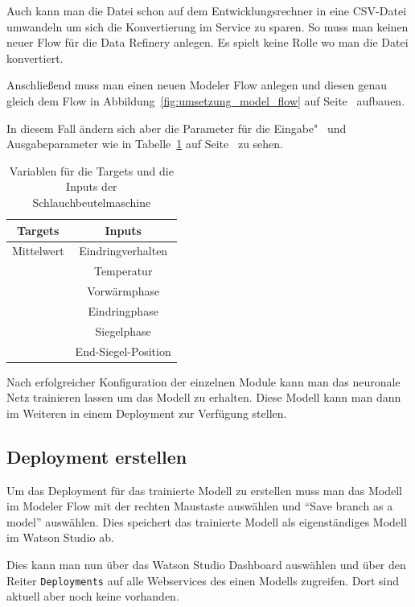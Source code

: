 Auch kann man die Datei schon auf dem Entwicklungsrechner in eine CSV-Datei umwandeln um sich die Konvertierung im
Service zu sparen. So muss man keinen neuer Flow für die Data Refinery anlegen. Es spielt keine Rolle wo man die Datei
konvertiert.

Anschließend muss man einen neuen Modeler Flow anlegen und diesen genau gleich dem Flow in
Abbildung~\ref{fig:umsetzung_model_flow} auf Seite~\pageref{fig:umsetzung_model_flow} aufbauen.

In diesem Fall ändern sich aber die Parameter für die Eingabe"~ und Ausgabeparameter wie in
Tabelle~\ref{tab:targets_inputs_siegeln} auf Seite~\pageref{tab:targets_inputs_siegeln} zu sehen.

\begin{table}[h]
    \centering
    \begin{tabular}{|c|c|}
        \hline
        \textbf{Targets} & \textbf{Inputs}\\
        \hline
        \hline
        Mittelwert & Eindringverhalten\\
        \hline
        & Temperatur\\
        \hline
        & Vorwärmphase\\
        \hline
        & Eindringphase\\
        \hline
        & Siegelphase\\
        \hline
        & End-Siegel-Position\\
        \hline
    \end{tabular}
    \caption{Variablen für die Targets und die Inputs der Schlauchbeutelmaschine}
    \label{tab:targets_inputs_siegeln}
\end{table}

Nach erfolgreicher Konfiguration der einzelnen Module kann man das neuronale Netz trainieren lassen um das Modell zu
erhalten. Diese Modell kann man dann im Weiteren in einem Deployment zur Verfügung stellen.

\subsection{Deployment erstellen}
Um das Deployment für das trainierte Modell zu erstellen muss man das Modell im Modeler Flow mit der rechten Maustaste
auswählen und \enquote{Save branch as a model} auswählen. Dies speichert das trainierte Modell als eigenständiges Modell
im Watson Studio ab.

Dies kann man nun über das Watson Studio Dashboard auswählen und über den Reiter \texttt{Deployments} auf alle
Webservices des einen Modells zugreifen. Dort sind aktuell aber noch keine vorhanden.


